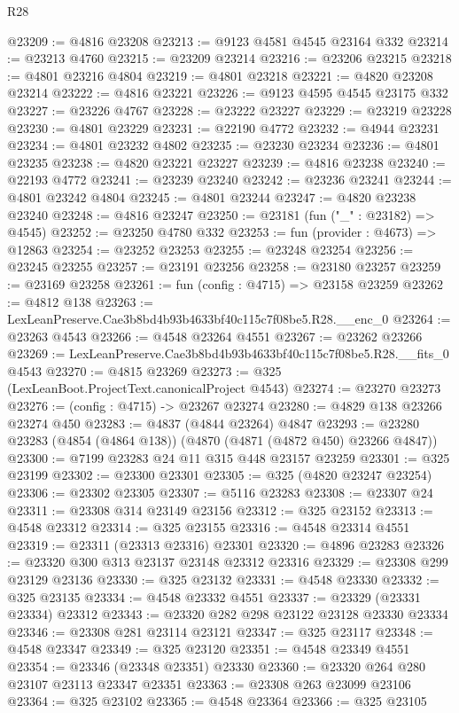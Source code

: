 \begin{lexlean}{R28}
\begin{coremodule}
@23209 := @4816 @23208
@23213 := @9123 @4581 @4545 @23164 @332
@23214 := @23213 @4760
@23215 := @23209 @23214
@23216 := @23206 @23215
@23218 := @4801 @23216 @4804
@23219 := @4801 @23218
@23221 := @4820 @23208 @23214
@23222 := @4816 @23221
@23226 := @9123 @4595 @4545 @23175 @332
@23227 := @23226 @4767
@23228 := @23222 @23227
@23229 := @23219 @23228
@23230 := @4801 @23229
@23231 := @22190 @4772
@23232 := @4944 @23231
@23234 := @4801 @23232 @4802
@23235 := @23230 @23234
@23236 := @4801 @23235
@23238 := @4820 @23221 @23227
@23239 := @4816 @23238
@23240 := @22193 @4772
@23241 := @23239 @23240
@23242 := @23236 @23241
@23244 := @4801 @23242 @4804
@23245 := @4801 @23244
@23247 := @4820 @23238 @23240
@23248 := @4816 @23247
@23250 := @23181 (fun ("_" : @23182) => @4545)
@23252 := @23250 @4780 @332
@23253 := fun (provider : @4673) => @12863
@23254 := @23252 @23253
@23255 := @23248 @23254
@23256 := @23245 @23255
@23257 := @23191 @23256
@23258 := @23180 @23257
@23259 := @23169 @23258
@23261 := fun (config : @4715) => @23158 @23259
@23262 := @4812 @138
@23263 := LexLeanPreserve.Cae3b8bd4b93b4633bf40c115c7f08be5.R28.__enc_0
@23264 := @23263 @4543
@23266 := @4548 @23264 @4551
@23267 := @23262 @23266
@23269 := LexLeanPreserve.Cae3b8bd4b93b4633bf40c115c7f08be5.R28.__fits_0 @4543
@23270 := @4815 @23269
@23273 := @325 (LexLeanBoot.ProjectText.canonicalProject @4543)
@23274 := @23270 @23273
@23276 := (config : @4715) -> @23267 @23274
@23280 := @4829 @138 @23266 @23274 @450
@23283 := @4837 (@4844 @23264) @4847
@23293 := @23280 @23283 (@4854 (@4864 @138)) (@4870 (@4871 (@4872 @450) @23266 @4847))
@23300 := @7199 @23283 @24 @11 @315 @448 @23157 @23259
@23301 := @325 @23199
@23302 := @23300 @23301
@23305 := @325 (@4820 @23247 @23254)
@23306 := @23302 @23305
@23307 := @5116 @23283
@23308 := @23307 @24
@23311 := @23308 @314 @23149 @23156
@23312 := @325 @23152
@23313 := @4548 @23312
@23314 := @325 @23155
@23316 := @4548 @23314 @4551
@23319 := @23311 (@23313 @23316) @23301
@23320 := @4896 @23283
@23326 := @23320 @300 @313 @23137 @23148 @23312 @23316
@23329 := @23308 @299 @23129 @23136
@23330 := @325 @23132
@23331 := @4548 @23330
@23332 := @325 @23135
@23334 := @4548 @23332 @4551
@23337 := @23329 (@23331 @23334) @23312
@23343 := @23320 @282 @298 @23122 @23128 @23330 @23334
@23346 := @23308 @281 @23114 @23121
@23347 := @325 @23117
@23348 := @4548 @23347
@23349 := @325 @23120
@23351 := @4548 @23349 @4551
@23354 := @23346 (@23348 @23351) @23330
@23360 := @23320 @264 @280 @23107 @23113 @23347 @23351
@23363 := @23308 @263 @23099 @23106
@23364 := @325 @23102
@23365 := @4548 @23364
@23366 := @325 @23105

\end{coremodule}
\end{lexlean}
